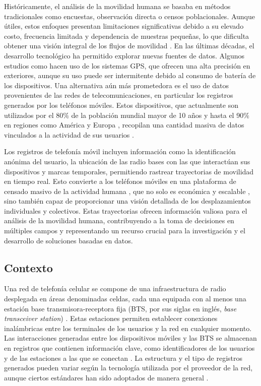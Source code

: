 Históricamente, el análisis de la movilidad humana se basaba en métodos tradicionales como encuestas, observación directa o censos poblacionales. Aunque útiles, estos enfoques presentan limitaciones significativas debido a su elevado costo, frecuencia limitada y dependencia de muestras pequeñas, lo que dificulta obtener una visión integral de los flujos de movilidad \cite{asgari2013survey}. En las últimas décadas, el desarrollo tecnológico ha permitido explorar nuevas fuentes de datos. Algunos estudios como \cite{gong2012gps} hacen uso de los sistemas GPS, que ofrecen una alta precisión en exteriores, aunque su uso puede ser intermitente debido al consumo de batería de los dispositivos. Una alternativa aún más prometedora es el uso de datos provenientes de las redes de telecomunicaciones, en particular los registros generados por los teléfonos móviles. Estos dispositivos, que actualmente son utilizados por el 80$\%$ de la población mundial mayor de 10 años y hasta el 90$\%$ en regiones como América y Europa \cite{ITU2024}, recopilan una cantidad masiva de datos vinculados a la actividad de sus usuarios \cite{toole2015path}.

Los registros de telefonía móvil incluyen información como la identificación anónima del usuario, la ubicación de las radio bases con las que interactúan sus dispositivos y marcas temporales, permitiendo rastrear trayectorias de movilidad en tiempo real. Esto convierte a los teléfonos móviles en una plataforma de censado masivo de la actividad humana \cite{doyle2014population}, que no solo es económica y escalable \cite{huang2019transport}, sino también capaz de proporcionar una visión detallada de los desplazamientos individuales y colectivos. Estas trayectorias ofrecen información valiosa para el análisis de la movilidad humana, contribuyendo a la toma de decisiones en múltiples campos y representando un recurso crucial para la investigación y el desarrollo de soluciones basadas en datos.

\subsection*{Contexto}

Una red de telefonía celular se compone de una infraestructura de radio desplegada en áreas denominadas celdas, cada una equipada con al menos una estación base transmisora-receptora fija (BTS, por sus siglas en inglés, \textit{base transceiver station}) \cite{sharma2012cell}. Estas estaciones permiten establecer conexiones inalámbricas entre los terminales de los usuarios y la red en cualquier momento. Las interacciones generadas entre los dispositivos móviles y las BTS se almacenan en registros que contienen información clave, como identificadores de los usuarios y de las estaciones a las que se conectan \cite{yuan2013characterizing}. La estructura y el tipo de registros generados pueden variar según la tecnología utilizada por el proveedor de la red, aunque ciertos estándares han sido adoptados de manera general \cite{durive2021sistema}.


